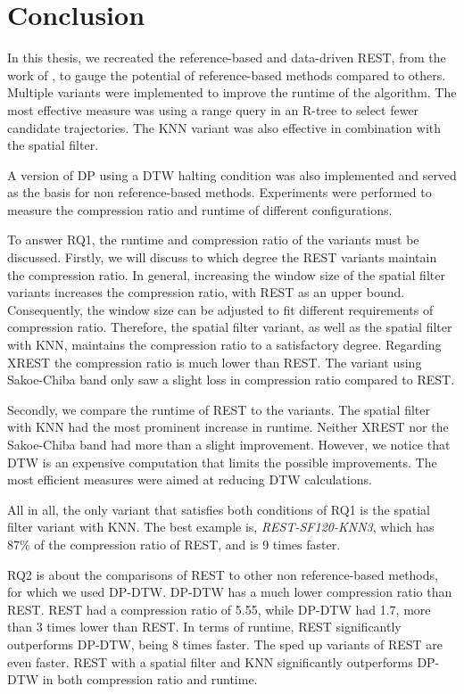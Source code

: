 \chapter{Conclusion}\label{chap:conclusion}
In this thesis, we recreated the reference-based and data-driven REST, from the work of \textcite{zhao2018rest}, to gauge the potential of reference-based methods compared to others. Multiple variants were implemented to improve the runtime of the algorithm. The most effective measure was using a range query in an R-tree to select fewer candidate trajectories. The KNN variant was also effective in combination with the spatial filter.

A version of DP using a DTW halting condition was also implemented and served as the basis for non reference-based methods. Experiments were performed to measure the compression ratio and runtime of different configurations.

To answer RQ1, the runtime and compression ratio of the variants must be discussed. Firstly, we will discuss to which degree the REST variants maintain the compression ratio. In general, increasing the window size of the spatial filter variants increases the compression ratio, with REST as an upper bound. Consequently, the window size can be adjusted to fit different requirements of compression ratio. Therefore, the spatial filter variant, as well as the spatial filter with KNN, maintains the compression ratio to a satisfactory degree. Regarding XREST the compression ratio is much lower than REST. The variant using Sakoe-Chiba band only saw a slight loss in compression ratio compared to REST.

Secondly, we compare the runtime of REST to the variants. The spatial filter with KNN had the most prominent increase in runtime. Neither XREST nor the Sakoe-Chiba band had more than a slight improvement. However, we notice that DTW is an expensive computation that limits the possible improvements. The most efficient measures were aimed at reducing DTW calculations.

All in all, the only variant that satisfies both conditions of RQ1 is the spatial filter variant with KNN. The best example is, \textit{REST-SF120-KNN3}, which has 87\% of the compression ratio of REST, and is 9 times faster.

RQ2 is about the comparisons of REST to other non reference-based methods, for which we used DP-DTW. DP-DTW has a much lower compression ratio than REST. REST had a compression ratio of 5.55, while DP-DTW had 1.7, more than 3 times lower than REST. In terms of runtime, REST significantly outperforms DP-DTW, being 8 times faster. The sped up variants of REST are even faster. REST with a spatial filter and KNN significantly outperforms DP-DTW in both compression ratio and runtime.

